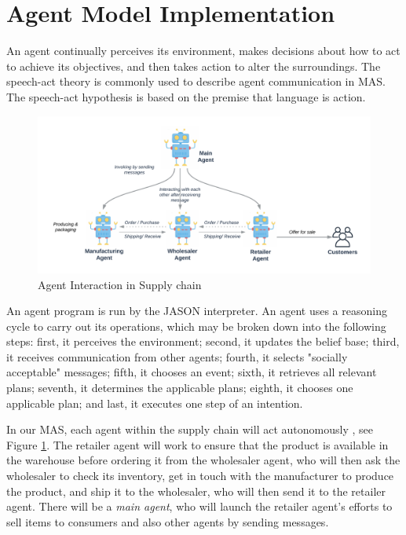 \section{Agent Model Implementation}

An agent continually perceives its environment, makes decisions about how to act to achieve its objectives, and then takes action to alter the surroundings. The speech-act theory is commonly used to describe agent communication in \ac{MAS}. The speech-act hypothesis is based on the premise that language is action.

\vspace{.5cm}

\begin{figure}[h]
    \centering
      \includegraphics[width=\linewidth]{includes/figures/agent.png} 
      \caption{Agent Interaction in Supply chain}
      \label{Agent Interaction}
    \end{figure}
  
\vspace{.5cm}

An agent program is run by the JASON interpreter. An agent uses a reasoning cycle to carry out its operations, which may be broken down into the following steps: first, it perceives the environment; second, it updates the belief base; third, it receives communication from other agents; fourth, it selects "socially acceptable" messages; fifth, it chooses an event; sixth, it retrieves all relevant plans; seventh, it determines the applicable plans; eighth, it chooses one applicable plan; and last, it executes one step of an intention.

\vspace{.5cm}

In our \ac{MAS}, each agent within the supply chain will act autonomously , see Figure \ref{Agent Interaction}. The retailer agent will work to ensure that the product is available in the warehouse before ordering it from the wholesaler agent, who will then ask the wholesaler to check its inventory, get in touch with the manufacturer to produce the product, and ship it to the wholesaler, who will then send it to the retailer agent. There will be a \textit{main agent}, who will launch the retailer agent's efforts to sell items to consumers and also other agents by sending messages.

